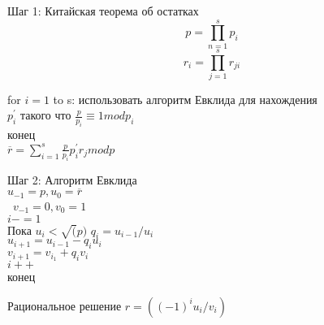 \documentclass[12pt]{article}
\begin{document}
\begin{algorithm}


 
\State Шаг 1: Китайская теорема об остатках \\
$$p=\prod\limits_{n = 1}^{s}p_i$$
$$ r_i=\prod\limits_{j = 1}^{s}r_{ji}$$

for $i = 1$ to s:
использовать алгоритм Евклида для нахождения \\
$p^{'}_i$ такого что $\frac{p}{p_i} \equiv 1 mod p_i$ \\
конец \\
$\overline{r}=\sum\limits_{i=1}^s\frac{p}{p_i}p_i^{'}r_j mod p$

Шаг 2: Алгоритм Евклида \\
$u_{-1}=p, u_0=\overline{r}$ \\\
$v_{-1}=0, v_0=1$ \\
$i-=1$ \\
Пока $u_i <\sqrt(p)$
$q_i=u_{i-1}/u_i$ \\
$u_{i+1}=u_{i-1}-q_iu_i$ \\
$v_{i+1}=v_{i_1} + q_iv_i$ \\
$i++$ \\
конец


Рациональное решение
$r=((-1)^iu_i/v_i)$

\end{algorithm}







	
\end{document}
